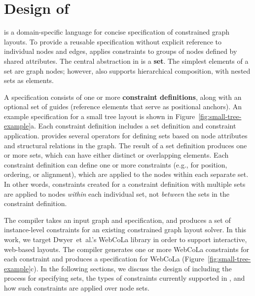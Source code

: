 \section{Design of \projectname}
\projectname is a domain-specific language for concise specification of 
constrained graph layouts. To provide a reusable specification 
without explicit reference to individual nodes and edges, \projectname
applies constraints to groups of nodes defined by shared attributes. 
The central abstraction in \projectname is a \textbf{set}. The 
simplest elements of a set are graph nodes; however, \projectname also
supports hierarchical composition, with nested sets as elements.

A \projectname specification consists of one or more \textbf{constraint definitions},
along with an optional set of guides (reference elements that serve as 
positional anchors). An example \projectname specification for a small tree 
layout is shown in Figure~\ref{fig:small-tree-example}a. Each constraint 
definition includes a set definition and constraint application.
\projectname provides several operators for defining
sets based on node attributes and structural relations in the graph.
The result of a set definition produces one or more sets, which 
can have either distinct or overlapping elements. Each constraint definition can 
define one or more constraints (e.g., for position, ordering, 
or alignment), which are applied to the nodes within each separate set. 
In other words, constraints created for a constraint definition with multiple sets are 
applied to nodes \emph{within} each individual set, not \emph{between} 
the sets in the constraint definition.

The \projectname compiler takes an input graph 
and specification, and produces a set of instance-level constraints for 
an existing constrained graph layout solver. In this work, we target 
Dwyer~et~al.'s WebCoLa library \cite{WebCoLa} in order to support
interactive, web-based layouts. The \projectname compiler generates one
or more WebCoLa constraints for each \projectname constraint and produces a
specification for WebCoLa (Figure~\ref{fig:small-tree-example}c).
 In the following sections, 
we discuss the design of \projectname including the process for 
specifying sets, the types of constraints currently supported in \projectname, 
and how such constraints are applied over node sets.

\smallTreeExampleWebCoLa

